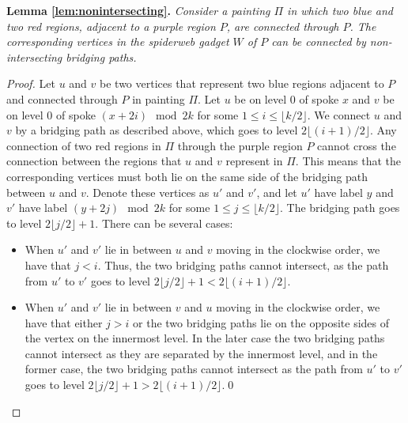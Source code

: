 \documentclass[runningheads]{llncs}
\newcommand{\cloneclaim}[2]{\medskip\noindent\textbf{#1.} \emph{#2}\smallskip}
\begin{document}
\cloneclaim{Lemma \ref{lem:nonintersecting}}{Consider a painting $\Pi$ in which two blue and two red regions, adjacent to a purple region $P$, are connected through $P$. The corresponding vertices in the spiderweb gadget $W$ of $P$ can be connected by non-intersecting bridging paths.}
\begin{proof}
Let $u$ and $v$ be two vertices that represent two blue regions adjacent to $P$ and connected through $P$ in painting $\Pi$.
Let $u$ be on level $0$ of spoke $x$ and $v$ be on level $0$ of spoke $(x+2i)\mod 2k$ for some $1 \leq i \leq \lfloor k/2 \rfloor$.
We connect $u$ and $v$ by a bridging path as described above, which goes to level $2\lfloor (i+1)/2 \rfloor$.
Any connection of two red regions in $\Pi$ through the purple region $P$ cannot cross the connection between the regions that $u$ and $v$ represent in $\Pi$.
This means that the corresponding vertices must both lie on the same side of the bridging path between $u$ and $v$. Denote these vertices as $u'$ and $v'$, and let $u'$ have label $y$ and $v'$ have label $(y+2j)\mod 2k$ for some $1 \leq j\leq \lfloor k/2\rfloor$. 
The bridging path goes to level $2\lfloor j/2 \rfloor+1$.
There can be several cases:
\begin{itemize}
\item When $u'$ and $v'$ lie in between $u$ and $v$ moving in the clockwise order, we have that $j<i$. Thus, the two bridging paths cannot intersect, as the path from $u'$ to $v'$ goes to level $2\lfloor j/2 \rfloor+1 < 2\lfloor (i+1)/2 \rfloor$.
\item When $u'$ and $v'$ lie in between $v$ and $u$ moving in the clockwise order, we have that either $j>i$ or the two bridging paths lie on the opposite sides of the vertex on the innermost level. In the later case the two bridging paths cannot intersect as they are separated by the innermost level, and in the former case, the two bridging paths cannot intersect as the path from $u'$ to $v'$ goes to level $2\lfloor j/2 \rfloor+1 > 2\lfloor (i+1)/2 \rfloor$.\hfill\qed
\end{itemize}
\end{proof}
\end{document}

